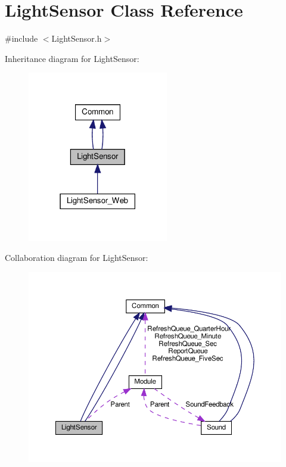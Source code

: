 \hypertarget{class_light_sensor}{}\section{Light\+Sensor Class Reference}
\label{class_light_sensor}


{\ttfamily \#include $<$Light\+Sensor.\+h$>$}



Inheritance diagram for Light\+Sensor\+:
\nopagebreak
\begin{figure}[H]
\begin{center}
\leavevmode
\includegraphics[width=174pt]{class_light_sensor__inherit__graph}
\end{center}
\end{figure}


Collaboration diagram for Light\+Sensor\+:
\nopagebreak
\begin{figure}[H]
\begin{center}
\leavevmode
\includegraphics[width=350pt]{class_light_sensor__coll__graph}
\end{center}
\end{figure}
